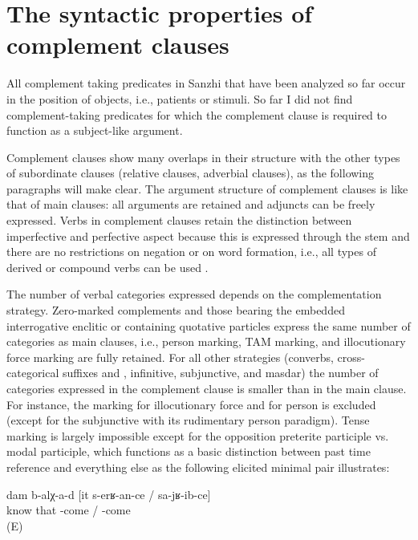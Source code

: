 
\section{The syntactic properties of complement clauses}
\label{sec:The syntactic properties of complement clauses}

All complement taking predicates in Sanzhi that have been analyzed so far occur in the position of objects, i.e., patients or stimuli. So far I did not find complement-taking predicates for which the complement clause is required to function as a subject-like argument.

Complement clauses show many overlaps in their structure with the other types of subordinate clauses (relative clauses, adverbial clauses), as the following paragraphs will make clear.
The argument structure of complement clauses is like that of main clauses: all arguments are retained and adjuncts can be freely expressed. Verbs in complement clauses retain the distinction between imperfective and perfective aspect because this is expressed through the stem and there are no restrictions on negation or on word formation, i.e., all types of derived or compound verbs can be used .

The number of verbal categories expressed depends on the complementation strategy. Zero-marked complements and those bearing the embedded interrogative enclitic or containing quotative particles express the same number of categories as main clauses, i.e., person marking, TAM marking, and illocutionary force marking are fully retained. For all other strategies (converbs, cross-categorical suffixes  and , infinitive, subjunctive, and masdar) the number of categories expressed in the complement clause is smaller than in the main clause. For instance, the marking for illocutionary force and for person is excluded (except for the subjunctive with its rudimentary person paradigm). Tense marking is largely impossible except for the opposition preterite participle vs. modal participle, which functions as a basic distinction between past time reference and everything else as the following elicited minimal pair illustrates:
%
\begin{exe}
	\ex	\label{ex:‎I know that he will come / came}
	\gll	dam	b-alχ-a-d	[it	s-erʁ-an-ce	/	sa-jʁ-ib-ce]\\
			know	that	-come	/	-come\\
	\glt	{} (E)
\end{exe}

